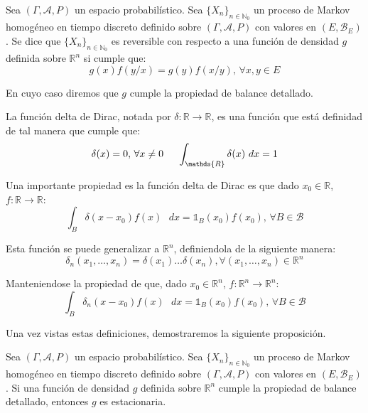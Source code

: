 \begin{definicion}
Sea $(\Gamma , \mathcal{A}, P)$ un espacio probabilístico. Sea $\{X_n\}_{n\in \mathds{N}_0}$ un proceso de Markov homogéneo en tiempo discreto definido sobre $(\Gamma, \mathcal{A}, P)$ con valores en $(E,\mathscr{B}_E)$. Se dice que $\{X_n\}_{n\in \mathds{N}_0}$ es reversible con respecto a una función de densidad $g$ definida sobre $\mathds{R}^n$ si cumple que:
\begin{equation}\label{detBal}
g(x)f(y/x) = g(y)f(x/y)\text{, }\forall x,y \in E
\end{equation}

En cuyo caso diremos que $g$ cumple la propiedad de balance detallado.
\end{definicion}

\begin{definicion}\label{deltaDirac}
La función delta de Dirac, notada por $\delta:\mathds{R}\rightarrow \mathds{R}$, es una función que está definidad de tal manera que cumple que:
$$\delta(x) = 0\text{, } \forall x\neq 0\hspace{0.5cm} \int_{\mathds{R}}\delta(x)\text{ }dx= 1$$

Una importante propiedad es la función delta de Dirac es que dado $x_0\in\mathds{R}$, $f:\mathds{R}\rightarrow \mathds{R}$:
$$\int_{B}\delta(x-x_0)f(x)\text{ }dx= \mathds{1}_B(x_0) f(x_0)\text{, }\forall B\in \mathscr{B}$$

Esta función se puede generalizar a $\mathds{R}^n$, definiendola de la siguiente manera:
$$\delta_n(x_1,\ldots ,x_n) = \delta(x_1)\ldots \delta(x_n){, } \forall (x_1,\ldots ,x_n)\in \mathds{R}^n$$

Manteniendose la propiedad de que, dado $x_0\in\mathds{R}^n$, $f:\mathds{R}^n\rightarrow \mathds{R}^n$:
$$\int_{B}\delta_n(x-x_0)f(x)\text{ }dx= \mathds{1}_B(x_0) f(x_0)\text{, }\forall B\in \mathscr{B}$$
\end{definicion}

Una vez vistas estas definiciones, demostraremos la siguiente proposición.

\begin{proposicion}
Sea $(\Gamma , \mathcal{A}, P)$ un espacio probabilístico. Sea $\{X_n\}_{n\in \mathds{N}_0}$ un proceso de Markov homogéneo en tiempo discreto definido sobre $(\Gamma, \mathcal{A}, P)$ con valores en $(E,\mathscr{B}_E)$. Si una función de densidad $g$ definida sobre $\mathds{R}^n$ cumple la propiedad de balance detallado, entonces $g$ es estacionaria.
\end{proposicion}

